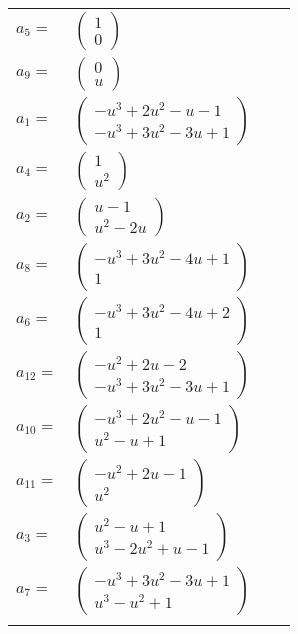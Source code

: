 \documentclass[1p]{elsarticle_modified}
\theoremstyle{definition}
\begin{document}
\begin{tabular}{m{7pt} m{180pt} m{7pt} m{180pt} }
\flushright $a_{5}=$&$\begin{pmatrix}1\\0\end{pmatrix}$ \\
\flushright $a_{9}=$&$\begin{pmatrix}0\\u\end{pmatrix}$ \\
\flushright $a_{1}=$&$\begin{pmatrix}- u^3+2 u^2- u-1\\- u^3+3 u^2-3 u+1\end{pmatrix}$ \\
\flushright $a_{4}=$&$\begin{pmatrix}1\\u^2\end{pmatrix}$ \\
\flushright $a_{2}=$&$\begin{pmatrix}u-1\\u^2-2 u\end{pmatrix}$ \\
\flushright $a_{8}=$&$\begin{pmatrix}- u^3+3 u^2-4 u+1\\1\end{pmatrix}$ \\
\flushright $a_{6}=$&$\begin{pmatrix}- u^3+3 u^2-4 u+2\\1\end{pmatrix}$ \\
\flushright $a_{12}=$&$\begin{pmatrix}- u^2+2 u-2\\- u^3+3 u^2-3 u+1\end{pmatrix}$ \\
\flushright $a_{10}=$&$\begin{pmatrix}- u^3+2 u^2- u-1\\u^2- u+1\end{pmatrix}$ \\
\flushright $a_{11}=$&$\begin{pmatrix}- u^2+2 u-1\\u^2\end{pmatrix}$ \\
\flushright $a_{3}=$&$\begin{pmatrix}u^2- u+1\\u^3-2 u^2+u-1\end{pmatrix}$ \\
\flushright $a_{7}=$&$\begin{pmatrix}- u^3+3 u^2-3 u+1\\u^3- u^2+1\end{pmatrix}$\\&\end{tabular}
\end{document}
